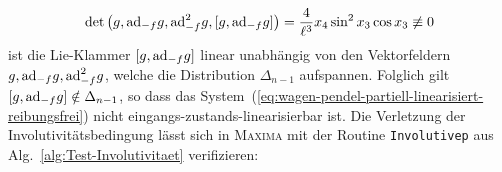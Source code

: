 \begin{example}
\begin{equation}
\det\left(g,{\operatorname{ad}}_{-f}g,{\operatorname{ad}}_{-f}^{2}g,[g,{\operatorname{ad}}_{-f}g]\right)=\frac{4}{\ell^{3}}x_{4}\sin^{2}x_{3}\cos x_{3}\not\equiv0\label{eq:wagen-pendel-det-nicht-inv-distr}
\end{equation}
ist die Lie-Klammer $[g,{\operatorname{ad}}_{-f}g]$ linear unabhängig von den Vektor\-feldern
$g,{\operatorname{ad}}_{-f}g,{\operatorname{ad}}_{-f}^{2}g$, welche die Distribution $\Delta_{n-1}$
aufspannen. Folglich gilt $[g,{\operatorname{ad}}_{-f}g]\notin\Delta_{n-1}$, so dass
das System~(\ref{eq:wagen-pendel-partiell-linearisiert-reibungsfrei})
nicht eingangs-zustands-linearisierbar ist. Die Verletzung der Involutivitätsbedingung
lässt sich in \textsc{Maxima} mit der Routine \texttt{Involutivep}
aus Alg.~\ref{alg:Test-Involutivitaet} verifizieren:
\end{example}
\begin{maxima}\end{maxima}

